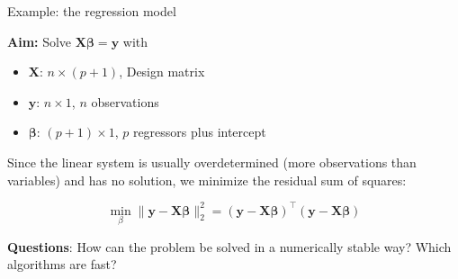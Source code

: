 \begin{vbframe}{Example: the regression model}

\textbf{Aim:} Solve $\bm{X}\boldsymbol{\beta} = \bm{y}$ with

\begin{itemize}
\item $\mathbf{X}$: $n \times (p + 1)$, Design matrix
\item $\mathbf{y}$: $n \times 1$, $n$ observations
\item $\boldsymbol{\beta}$: $(p + 1) \times 1$, $p$ regressors plus intercept
\end{itemize}

Since the linear system is usually overdetermined (more observations than variables) and has no solution, we minimize the residual sum of squares:

$$
\min_\beta \|\mathbf{y} - \mathbf{X}\boldsymbol{\beta}\|^2_2 = (\mathbf{y} - \mathbf{X}\boldsymbol{\beta})^\top
  (\mathbf{y} - \mathbf{X}\boldsymbol{\beta})
$$

\lz

\textbf{Questions}: How can the problem be solved in a numerically stable way? Which algorithms are fast?







\end{vbframe}
